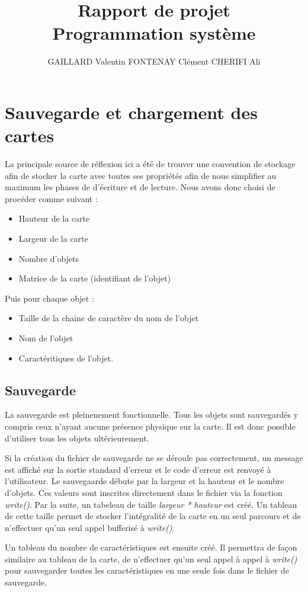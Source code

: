 \documentclass[10pt,a4paper]{article}
\author{GAILLARD Valentin FONTENAY Clément CHERIFI Ali}
\title{Rapport de projet\\Programmation système}
\begin{document}
\maketitle
\newpage
\tableofcontents
\newpage

\section{Sauvegarde et chargement des cartes}
La principale source de réflexion ici a été de trouver une convention de stockage afin de stocker la carte avec toutes ses propriétés afin de nous simplifier au maximum les phases de d'écriture et de lecture.
Nous avons donc choisi de procéder comme suivant : 
\begin{itemize}
\item Hauteur de la carte
\item Largeur de la carte
\item Nombre d'objets
\item Matrice de la carte (identifiant de l'objet)
\end{itemize}
Puis pour chaque objet : 
\begin{itemize}
\item Taille de la chaine de caractère du nom de l'objet 
\item Nom de l'objet 
\item Caractéritiques de l'objet.
\end{itemize}
\subsection{Sauvegarde}

	La sauvegarde est pleinenement fonctionnelle. Tous les objets sont sauvegardés y compris ceux n'ayant aucune présence physique sur la carte. Il est donc possible d'utiliser tous les objets ultérieurement.
	
	Si la création du fichier de sauvegarde ne se déroule pas correctement, un message est affiché sur la sortie standard d'erreur et le code d'erreur est renvoyé à l'utilisateur.
	Le sauvegaarde débute par la largeur et la hauteur et le nombre d'objets. Ces valeurs sont inscrites directement dans le fichier via la fonction \textit{write()}. 
	Par la suite, un tabeleau de taille \textit{largeur * hauteur} est créé. Un tableau de cette taille permet de stocker l'intégralité de la carte en un seul parcours et de n'effectuer qu'un seul appel bufferisé à \textit{write()}.
	
	Un tableau du nombre de caractéristiques est ensuite créé. Il permettra de façon similaire au tableau de la carte, de n'effectuer qu'un seul appel à appel à \textit{write()} pour sauvegarder toutes les caractéristiques en une seule fois dans le fichier de sauvegarde.
\end{document}
